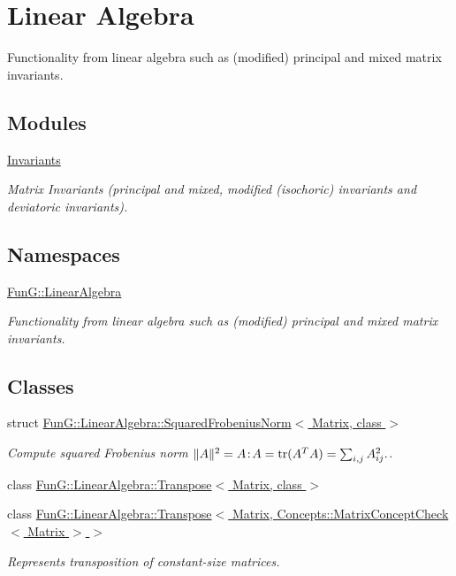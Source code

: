 \hypertarget{group__LinearAlgebraGroup}{\section{Linear Algebra}
\label{group__LinearAlgebraGroup}
}


Functionality from linear algebra such as (modified) principal and mixed matrix invariants.  


\subsection*{Modules}
\begin{DoxyCompactItemize}
\item 
\hyperlink{group__InvariantGroup}{Invariants}
\begin{DoxyCompactList}\small\item\em Matrix Invariants (principal and mixed, modified (isochoric) invariants and deviatoric invariants). \end{DoxyCompactList}\end{DoxyCompactItemize}
\subsection*{Namespaces}
\begin{DoxyCompactItemize}
\item 
\hyperlink{namespaceFunG_1_1LinearAlgebra}{Fun\-G\-::\-Linear\-Algebra}
\begin{DoxyCompactList}\small\item\em Functionality from linear algebra such as (modified) principal and mixed matrix invariants. \end{DoxyCompactList}\end{DoxyCompactItemize}
\subsection*{Classes}
\begin{DoxyCompactItemize}
\item 
struct \hyperlink{structFunG_1_1LinearAlgebra_1_1SquaredFrobeniusNorm}{Fun\-G\-::\-Linear\-Algebra\-::\-Squared\-Frobenius\-Norm$<$ Matrix, class $>$}
\begin{DoxyCompactList}\small\item\em Compute squared Frobenius norm $ \|A\|^2 = A\negthinspace : \negthinspace A = \mathrm{tr}(A^TA) = \sum_{i,j} A_{ij}^2. $. \end{DoxyCompactList}\item 
class \hyperlink{classFunG_1_1LinearAlgebra_1_1Transpose}{Fun\-G\-::\-Linear\-Algebra\-::\-Transpose$<$ Matrix, class $>$}
\item 
class \hyperlink{classFunG_1_1LinearAlgebra_1_1Transpose_3_01Matrix_00_01Concepts_1_1MatrixConceptCheck_3_01Matrix_01_4_01_4}{Fun\-G\-::\-Linear\-Algebra\-::\-Transpose$<$ Matrix, Concepts\-::\-Matrix\-Concept\-Check$<$ Matrix $>$ $>$}
\begin{DoxyCompactList}\small\item\em Represents transposition of constant-\/size matrices. \end{DoxyCompactList}\end{DoxyCompactItemize}
